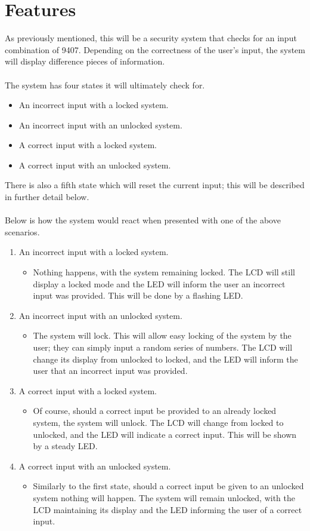 \documentclass[10pt,a4paper]{article}
\begin{document}
\section{Features}
As previously mentioned, this will be a security system that checks for an input combination of 9407. Depending on the correctness of the user's input, the system will display difference pieces of information.\\~\\
The system has four states it will ultimately check for.
\begin{itemize}
	\item An incorrect input with a locked system.
	\item An incorrect input with an unlocked system.
	\item A correct input with a locked system.
	\item A correct input with an unlocked system.
\end{itemize}
There is also a fifth state which will reset the current input; this will be described in further detail below. \\~\\
Below is how the system would react when presented with one of the above scenarios.
\begin{enumerate}
	\item An incorrect input with a locked system.
	\begin{itemize}
		\item Nothing happens, with the system remaining locked. The LCD will still display a locked mode and the LED will inform the user an incorrect input was provided. This will be done by a flashing LED.
	\end{itemize}
	\item An incorrect input with an unlocked system. 
	\begin{itemize}
		\item The system will lock. This will allow easy locking of the system by the user; they can simply input a random series of numbers. The LCD will change its display from unlocked to locked, and the LED will inform the user that an incorrect input was provided.
	\end{itemize}
	\item A correct input with a locked system.
	\begin{itemize}
		\item Of course, should a correct input be provided to an already locked system, the system will unlock. The LCD will change from locked to unlocked, and the LED will indicate a correct input. This will be shown by a steady LED.
	\end{itemize}
	\item A correct input with an unlocked system.
	\begin{itemize}
		\item Similarly to the first state, should a correct input be given to an unlocked system nothing will happen. The system will remain unlocked, with the LCD maintaining its display and the LED informing the user of a correct input.
	\end{itemize}
\end{enumerate}
\end{document}
